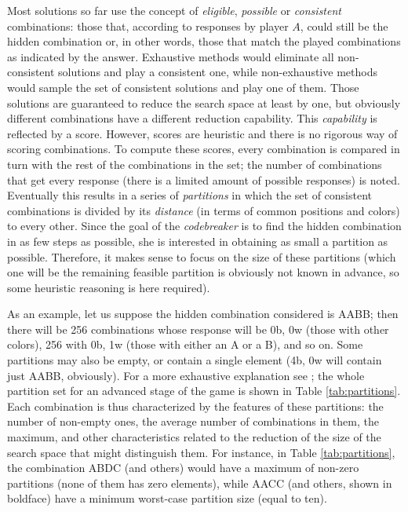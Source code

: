 \documentclass[conference]{IEEEtran}
\begin{document}
Most solutions so far \cite{o1991mastermind,francisstrategies:moo,Berghman20091880,nicso} use the concept of {\em
    eligible}, {\em possible} or {\em
  consistent} combinations: those that, according to responses by
player $A$, could still be the hidden combination or, in other
words, those that match the played combinations as indicated by the
answer. Exhaustive methods  \cite{Knuth,DBLP:journals/corr/abs-1207-1315} would eliminate all non-consistent
solutions and play a consistent one, while non-exhaustive methods
would sample the set of consistent solutions and play one of
them. Those solutions are guaranteed to reduce the search space at
least by one, but obviously different combinations have a different
reduction capability. This {\em capability} is reflected by a
score. However, scores are heuristic and there is no rigorous way of
scoring combinations. To compute these scores, every combination is
compared in turn with the rest of the combinations in the set; the
number of combinations that get every response (there is a limited
amount of possible responses) is noted. Eventually this results in a
series of {\em partitions} in which the set of consistent combinations
is divided by its {\em distance} (in terms of common positions and
colors) to every other.  Since the goal of the
{\em codebreaker} 
is to find the hidden combination in as few steps as
possible, she is interested in obtaining as small a partition as
possible. Therefore, it makes sense to focus on the size of these
partitions (which one will be the remaining feasible partition is
obviously not known in advance, so some heuristic reasoning is here
required). 

As an example, let us suppose
the hidden combination considered is AABB; then there will be 256 combinations whose response will be 0b, 0w (those with other colors), 256 with 0b, 1w (those with either an A or a B), and so on. Some partitions may also be empty, or contain a single element (4b, 0w will contain just AABB, obviously).  For a more exhaustive explanation see \cite{Kooi200513}; the whole partition set for an
advanced stage of the game is shown in Table \ref{tab:partitions}. Each combination is thus characterized by the features of these partitions: the number of non-empty ones, the average number of combinations in them, the
maximum, and other characteristics related to the reduction of the size of the search space that might distinguish them. 
For instance, in Table \ref{tab:partitions}, the combination ABDC (and others) would have a maximum of non-zero partitions (none of them has zero elements), while AACC (and others, shown in boldface) have a minimum worst-case
partition size (equal to ten).
\end{document}
